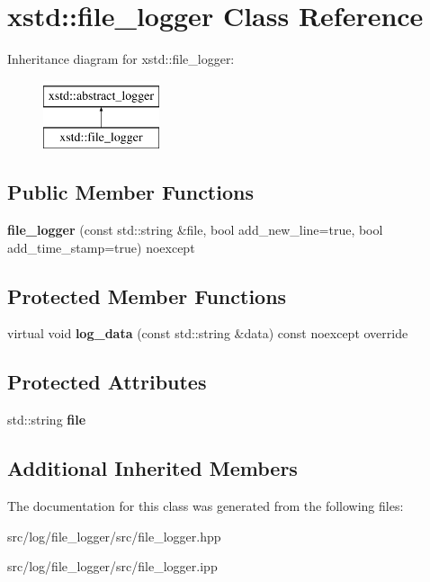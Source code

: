 \hypertarget{classxstd_1_1file__logger}{\section{xstd\-:\-:file\-\_\-logger Class Reference}
\label{classxstd_1_1file__logger}
}
Inheritance diagram for xstd\-:\-:file\-\_\-logger\-:\begin{figure}[H]
\begin{center}
\leavevmode
\includegraphics[height=2.000000cm]{classxstd_1_1file__logger}
\end{center}
\end{figure}
\subsection*{Public Member Functions}
\begin{DoxyCompactItemize}
\item 
\hypertarget{classxstd_1_1file__logger_a6e43dc8871b62e45550ce6470dcf5477}{{\bfseries file\-\_\-logger} (const std\-::string \&file, bool add\-\_\-new\-\_\-line=true, bool add\-\_\-time\-\_\-stamp=true) noexcept}\label{classxstd_1_1file__logger_a6e43dc8871b62e45550ce6470dcf5477}

\end{DoxyCompactItemize}
\subsection*{Protected Member Functions}
\begin{DoxyCompactItemize}
\item 
\hypertarget{classxstd_1_1file__logger_a806b0a7c20bad624afbddd2346312ca6}{virtual void {\bfseries log\-\_\-data} (const std\-::string \&data) const noexcept override}\label{classxstd_1_1file__logger_a806b0a7c20bad624afbddd2346312ca6}

\end{DoxyCompactItemize}
\subsection*{Protected Attributes}
\begin{DoxyCompactItemize}
\item 
\hypertarget{classxstd_1_1file__logger_a0745eaab93df733f6696fa14e74eb068}{std\-::string {\bfseries file}}\label{classxstd_1_1file__logger_a0745eaab93df733f6696fa14e74eb068}

\end{DoxyCompactItemize}
\subsection*{Additional Inherited Members}


The documentation for this class was generated from the following files\-:\begin{DoxyCompactItemize}
\item 
src/log/file\-\_\-logger/src/file\-\_\-logger.\-hpp\item 
src/log/file\-\_\-logger/src/file\-\_\-logger.\-ipp\end{DoxyCompactItemize}
